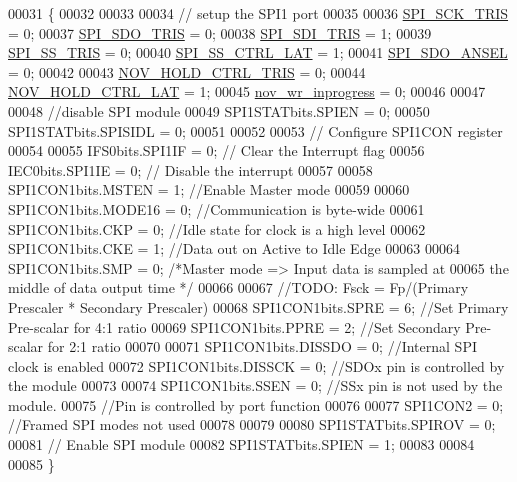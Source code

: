 \begin{DoxyCode}
00031 \{
00032 
00033 
00034     \textcolor{comment}{// setup the SPI1 port}
00035     
00036             \hyperlink{a00013_a98c4bd0ee0f76eb205e874355bf9cd33}{SPI\_SCK\_TRIS}        = 0;
00037             \hyperlink{a00013_aa171067a2f57d1555ab4449c78847c72}{SPI\_SDO\_TRIS}        = 0;
00038             \hyperlink{a00013_a40c85fd42ffb12b326b7cb9ee48f2ffb}{SPI\_SDI\_TRIS}        = 1;
00039             \hyperlink{a00013_a1424f86a2482cfbcf68f709ce542e262}{SPI\_SS\_TRIS}         = 0;
00040             \hyperlink{a00013_aa8b53e04161d178ebd9c01edf1584039}{SPI\_SS\_CTRL\_LAT}     = 1;
00041             \hyperlink{a00013_a11571727bdbc21b0bfb7c701599e759b}{SPI\_SDO\_ANSEL}       = 0;
00042             
00043            \hyperlink{a00029_a37dc9980ee3379d4bd3a66f7cf9d761e}{NOV\_HOLD\_CTRL\_TRIS}   = 0;
00044            \hyperlink{a00029_aa03a6ff293decd7159ed1642ccbac971}{NOV\_HOLD\_CTRL\_LAT}    = 1;
00045            \hyperlink{a00029_a56fe014653ebdce270aeac664bf86e65}{nov\_wr\_inprogress}    = 0;
00046 
00047 
00048       \textcolor{comment}{//disable SPI module}
00049        SPI1STATbits.SPIEN       = 0;
00050        SPI1STATbits.SPISIDL     = 0;
00051     
00052 
00053 \textcolor{comment}{// Configure SPI1CON register}
00054     
00055         IFS0bits.SPI1IF         = 0;    \textcolor{comment}{// Clear the Interrupt flag}
00056         IEC0bits.SPI1IE         = 0;    \textcolor{comment}{// Disable the interrupt}
00057 
00058         SPI1CON1bits.MSTEN      = 1;   \textcolor{comment}{//Enable Master mode}
00059 
00060         SPI1CON1bits.MODE16     = 0;  \textcolor{comment}{//Communication is byte-wide}
00061         SPI1CON1bits.CKP        = 0;   \textcolor{comment}{//Idle state for clock is a high level}
00062         SPI1CON1bits.CKE        = 1;   \textcolor{comment}{//Data out on Active to Idle Edge}
00063 
00064         SPI1CON1bits.SMP        = 0;  \textcolor{comment}{/*Master mode => Input data is sampled at}
00065 \textcolor{comment}{                                        the middle of data output time */}
00066 
00067         \textcolor{comment}{//TODO: Fsck = Fp/(Primary Prescaler * Secondary Prescaler)}
00068         SPI1CON1bits.SPRE       = 6;     \textcolor{comment}{//Set Primary Pre-scalar for 4:1 ratio}
00069         SPI1CON1bits.PPRE       = 2;     \textcolor{comment}{//Set Secondary Pre-scalar for 2:1 ratio}
00070 
00071         SPI1CON1bits.DISSDO     = 0;     \textcolor{comment}{//Internal SPI clock is enabled}
00072         SPI1CON1bits.DISSCK     = 0;     \textcolor{comment}{//SDOx pin is controlled by the module}
00073 
00074         SPI1CON1bits.SSEN       = 0;     \textcolor{comment}{//SSx pin is not used by the module.}
00075                                          \textcolor{comment}{//Pin is controlled by port function}
00076 
00077         SPI1CON2                = 0;     \textcolor{comment}{//Framed SPI modes not used}
00078 
00079 
00080         SPI1STATbits.SPIROV     = 0;
00081         \textcolor{comment}{//  Enable SPI module}
00082         SPI1STATbits.SPIEN       = 1;
00083 
00084 
00085 \}
\end{DoxyCode}


